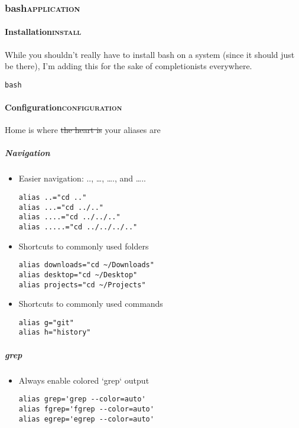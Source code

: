 \documentclass[11pt]{article}
\begin{document}
\subsubsection{bash\hfill{}\textsc{application}}
\label{sec:org66ab0f9}
\paragraph{Installation\hfill{}\textsc{install}}
\label{sec:org8e50fea}
While you shouldn't really have to install bash on a system (since it should just be there), I'm adding this for the sake of completionists everywhere.
\begin{verbatim}
bash
\end{verbatim}

\paragraph{Configuration\hfill{}\textsc{configuration}}
\label{sec:orgc2d1ae8}

Home is where \sout{the heart is} your aliases are

\subparagraph{Navigation}
\label{sec:orgbd17e9e}
\begin{itemize}
\item Easier navigation: .., \ldots{}, \ldots{}., and \ldots{}..
\label{sec:orgcf2dcbf}
\begin{verbatim}
alias ..="cd .."
alias ...="cd ../.."
alias ....="cd ../../.."
alias .....="cd ../../../.."
\end{verbatim}
\item Shortcuts to commonly used folders
\label{sec:org7251325}
\begin{verbatim}
alias downloads="cd ~/Downloads"
alias desktop="cd ~/Desktop"
alias projects="cd ~/Projects"
\end{verbatim}
\item Shortcuts to commonly used commands
\label{sec:org39c20ca}
\begin{verbatim}
alias g="git"
alias h="history"
\end{verbatim}
\end{itemize}

\subparagraph{grep}
\label{sec:org67cf9c7}
\begin{itemize}
\item Always enable colored `grep` output
\label{sec:orgd1d5223}
\begin{verbatim}
alias grep='grep --color=auto'
alias fgrep='fgrep --color=auto'
alias egrep='egrep --color=auto'
\end{verbatim}
\end{itemize}
\end{document}
